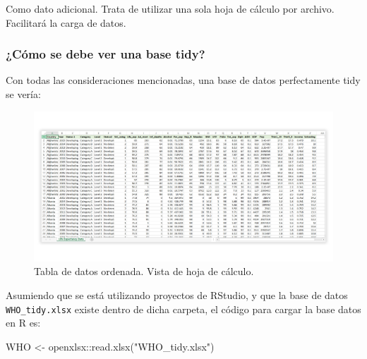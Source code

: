 \documentclass[
]{article}
\newenvironment{Shaded}{\begin{snugshade}}{\end{snugshade}}
\newcommand{\FunctionTok}[1]{\textcolor[rgb]{0.00,0.00,0.00}{#1}}
\newcommand{\NormalTok}[1]{#1}
\newcommand{\OtherTok}[1]{\textcolor[rgb]{0.56,0.35,0.01}{#1}}
\newcommand{\SpecialCharTok}[1]{\textcolor[rgb]{0.00,0.00,0.00}{#1}}
\newcommand{\StringTok}[1]{\textcolor[rgb]{0.31,0.60,0.02}{#1}}
\theoremstyle{definition}
\theoremstyle{definition}
\theoremstyle{definition}
\theoremstyle{definition}
\theoremstyle{remark}
\begin{document}
Como dato adicional. Trata de utilizar una sola hoja de cálculo por archivo. Facilitará la carga de datos.

\hypertarget{cuxf3mo-se-debe-ver-una-base-tidy}{%
\subsubsection{¿Cómo se debe ver una base tidy?}\label{cuxf3mo-se-debe-ver-una-base-tidy}}

Con todas las consideraciones mencionadas, una base de datos perfectamente tidy se vería:



\begin{figure}

{\centering \includegraphics[width=1\linewidth]{figs/screenshots/excel5} 

}

\caption{Tabla de datos ordenada. Vista de hoja de cálculo.}\label{fig:figura56}
\end{figure}

Asumiendo que se está utilizando proyectos de RStudio, y que la base de datos \texttt{WHO\_tidy.xlsx} existe dentro de dicha carpeta, el código para cargar la base datos en R es:

\begin{Shaded}
\begin{Highlighting}[]
\NormalTok{WHO }\OtherTok{\textless{}{-}}\NormalTok{ openxlsx}\SpecialCharTok{::}\FunctionTok{read.xlsx}\NormalTok{(}\StringTok{"WHO\_tidy.xlsx"}\NormalTok{)}
\end{Highlighting}
\end{Shaded}
\end{document}
